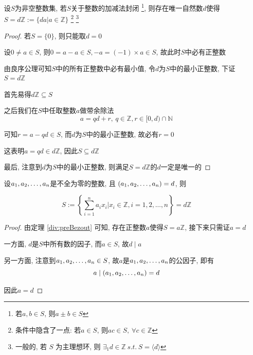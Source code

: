\begin{theorem}
    \label{div:preBezout}
    设\(S\)为非空整数集, 若\(S\)关于整数的加减法封闭 \footnote{若\(a,b\in S\), 则\(a\pm b\in S\)}, 则存在唯一自然数\(d\)使得\(S=d\mathbb{Z}:=\{da|a\in\mathbb{Z}\}\) \footnote{条件中隐含了一点: 若\(a\in S\), 则\(ac\in S,~\forall c\in\mathbb{Z}\)} \footnote{一般的, 若 \(S\) 为主理想环, 则 \(\exists_1 d\in\mathbb{Z}~s.t.~S=\langle d\rangle\)}
    
    \begin{proof}

        若\(S=\{0\}\), 则只能取\(d=0\)
        
        设\(0\ne a\in S\), 则\(0=a-a\in S,-a=(-1)\times a\in S\),
        故此时\(S\)中必有正整数
        
        由良序公理可知\(S\)中的所有正整数中必有最小值,
        令\(d\)为\(S\)中的最小正整数, 下证\(S=d\mathbb{Z}\)
        
        首先易得\(d\mathbb{Z}\subseteq S\)
        
        之后我们在\(S\)中任取整数\(a\)做带余除法
        \begin{equation}
            a=qd+r,~q\in\mathbb{Z},r\in[0,d)\cap\mathbb{N}
        \end{equation}
        
        可知\(r=a-qd\in S\),
        而\(d\)为\(S\)中的最小正整数, 故必有\(r=0\)
        
        这表明\(a=qd\in d\mathbb{Z}\), 因此\(S\subseteq d\mathbb{Z}\)
        
        最后, 注意到\(d\)为\(S\)中的最小正整数,
        则满足\(S=d\mathbb{Z}\)的\(d\)一定是唯一的
        
    \end{proof}
\end{theorem}

\begin{corollary}[B\'{e}zout 定理]
    \label{gcdlcm:bezout}
    设\(\def\enum#1{a_{ #1}}\enum{1},\enum{2},\dots,\enum{n}\)是不全为零的整数, 且
    \((\def\enum#1{a_{ #1}}\enum{1},\enum{2},\dots,\enum{n})=d\), 则
    
    \begin{equation}
        S:=\left\{\sum_{i=1}^na_ix_i\bigg|x_i\in\mathbb{Z},i=1,2,\dots,n\right\}=d\mathbb{Z}
    \end{equation}
    
    \begin{proof}
        由定理 \ref{div:preBezout} 可知, 存在正整数\(a\)使得\(S=a\mathbb{Z}\), 接下来只需证\(a=d\)
        
        一方面, \(d\)是\(S\)中所有数的因子, 而\(a\in S\), 故\(d\mid a\)
        
        另一方面, 注意到\(\def\enum#1{a_{ #1}}\enum{1},\enum{2},\dots,\enum{n}\in S\), 故\(a\)是\(\def\enum#1{a_{ #1}}\enum{1},\enum{2},\dots,\enum{n}\)的公因子, 即有
        \begin{equation}
            a\mid(\def\enum#1{a_{ #1}}\enum{1},\enum{2},\dots,\enum{n})=d
        \end{equation}
        
        因此\(a=d\)
        
    \end{proof}
\end{corollary}
